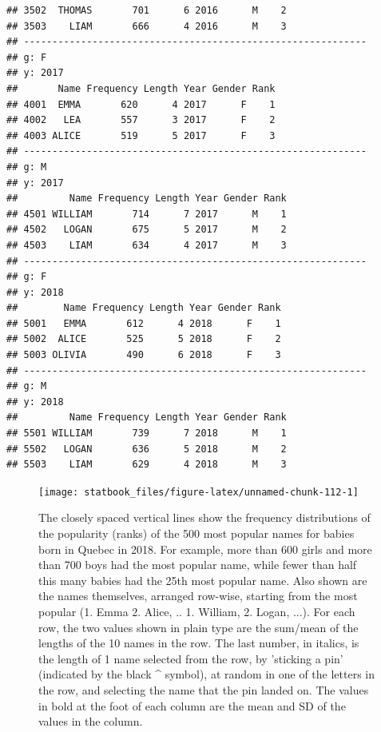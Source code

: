 \documentclass[]{book}
\begin{document}
\begin{verbatim}
## 3502  THOMAS       701      6 2016      M    2
## 3503    LIAM       666      4 2016      M    3
## ------------------------------------------------------------ 
## g: F
## y: 2017
##       Name Frequency Length Year Gender Rank
## 4001  EMMA       620      4 2017      F    1
## 4002   LEA       557      3 2017      F    2
## 4003 ALICE       519      5 2017      F    3
## ------------------------------------------------------------ 
## g: M
## y: 2017
##         Name Frequency Length Year Gender Rank
## 4501 WILLIAM       714      7 2017      M    1
## 4502   LOGAN       675      5 2017      M    2
## 4503    LIAM       634      4 2017      M    3
## ------------------------------------------------------------ 
## g: F
## y: 2018
##        Name Frequency Length Year Gender Rank
## 5001   EMMA       612      4 2018      F    1
## 5002  ALICE       525      5 2018      F    2
## 5003 OLIVIA       490      6 2018      F    3
## ------------------------------------------------------------ 
## g: M
## y: 2018
##         Name Frequency Length Year Gender Rank
## 5501 WILLIAM       739      7 2018      M    1
## 5502   LOGAN       636      5 2018      M    2
## 5503    LIAM       629      4 2018      M    3
\end{verbatim}

\begin{figure}

{\centering \texttt{[image: statbook\_files/figure-latex/unnamed-chunk-112-1]} 

}

\caption{The closely spaced vertical lines show the frequency distributions of the popularity (ranks) of the 500 most popular names for babies born in Quebec in 2018. For example, more than 600 girls and more than 700 boys had the most popular name, while fewer than half this many babies had the 25th  most popular name. Also shown are the names themselves, arranged row-wise, starting from the most popular (1. Emma  2. Alice, .. 1. William, 2. Logan, ...). For each row, the two values shown in plain type are the sum/mean of the lengths of the 10 names in the row. The last number, in italics, is the length of 1 name selected from the row, by 'sticking a pin' (indicated by the black ^ symbol), at random in one of the letters in the row, and selecting the name that the pin landed on. The values in bold at the foot of each column are the mean and SD of the values in the column.}\label{fig:unnamed-chunk-112}
\end{figure}
\end{document}
